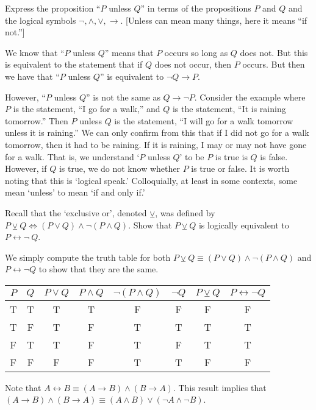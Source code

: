\documentclass[11pt,letterpaper]{article}
\begin{document}
\newpage



 Express the proposition ``$P$ unless $Q$'' in terms of the propositions $P$ and $Q$ and the logical symbols $\neg, \wedge, \vee, \to$. [Unless can mean many things, here it means ``if not.'']

\sol We know that ``$P$ unless $Q$'' means that $P$ occurs so long as $Q$ does not. But this is equivalent to the statement that if $Q$ does not occur, then $P$ occurs. But then we have that ``$P$ unless $Q$'' is equivalent to $\neg Q \to P$. 

However, ``$P$ unless $Q$'' is not the same as $Q \to \neg P$. Consider the example where $P$ is the statement, ``I go for a walk,'' and $Q$ is the statement, ``It is raining tomorrow.'' Then $P$ unless $Q$ is the statement, ``I will go for a walk tomorrow unless it is raining.'' We can only confirm from this that if I did not go for a walk tomorrow, then it had to be raining. If it is raining, I may or may not have gone for a walk. That is, we understand `$P$ unless $Q$' to be $P$ is true is $Q$ is false. However, if $Q$ is true, we do not know whether $P$ is true or false. It is worth noting that this is `logical speak.' Colloquially, at least in some contexts, some mean `unless' to mean `if and only if.' 



\newpage



 Recall that the `exclusive or', denoted $\veebar$, was defined by $P \veebar Q \Leftrightarrow (P \vee Q) \wedge \neg (P \wedge Q)$. Show that $P \veebar Q$ is logically equivalent to $P \leftrightarrow \neg\ Q$.



\sol We simply compute the truth table for both $P \veebar Q \equiv (P \vee Q) \wedge \neg (P \wedge Q)$ and $P \leftrightarrow \neg Q$ to show that they are the same.
	\begin{table}[!ht]
	\centering
	\begin{tabular}{c|c||c|c|c|c||c|c}
	$P$ & $Q$ & $P \vee Q$ & $P \wedge Q$ & $\neg (P \wedge Q)$ & $\neg Q$ & $P \veebar Q$ & $P \leftrightarrow \neg Q$ \\ \hline
	T & T & T & T & F & F & F & F \\
	T & F & T & F & T & T & T & T \\
	F & T & T & F & T & F & T & T \\
	F & F & F & F & T & T & F & F
	\end{tabular}
	\end{table} \par
Note that $A \leftrightarrow B \equiv (A \to B) \wedge (B \to A)$. This result implies that $(A \to B) \wedge (B \to A) \equiv (A \wedge B) \vee (\neg A \wedge \neg B)$. 
\end{document}
